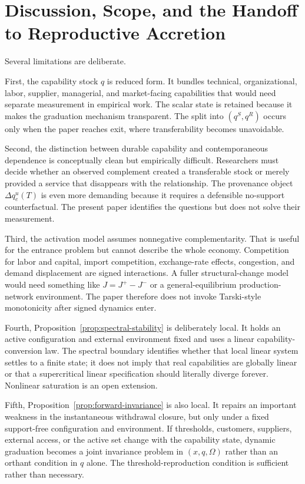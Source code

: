 \section{Discussion, Scope, and the Handoff to Reproductive Accretion}
\label{sec:discussion}

Several limitations are deliberate.

First, the capability stock $q$ is reduced form. It bundles technical, organizational, labor, supplier, managerial, and market-facing capabilities that would need separate measurement in empirical work. The scalar state is retained because it makes the graduation mechanism transparent. The split into $(q^S,q^R)$ occurs only when the paper reaches exit, where transferability becomes unavoidable.

Second, the distinction between durable capability and contemporaneous dependence is conceptually clean but empirically difficult. Researchers must decide whether an observed complement created a transferable stock or merely provided a service that disappears with the relationship. The provenance object $\Delta q_e^u(T)$ is even more demanding because it requires a defensible no-support counterfactual. The present paper identifies the questions but does not solve their measurement.

Third, the activation model assumes nonnegative complementarity. That is useful for the entrance problem but cannot describe the whole economy. Competition for labor and capital, import competition, exchange-rate effects, congestion, and demand displacement are signed interactions. A fuller structural-change model would need something like $J=J^+-J^-$ or a general-equilibrium production-network environment. The paper therefore does not invoke Tarski-style monotonicity after signed dynamics enter.

Fourth, Proposition~\ref{prop:spectral-stability} is deliberately local. It holds an active configuration and external environment fixed and uses a linear capability-conversion law. The spectral boundary identifies whether that local linear system settles to a finite state; it does not imply that real capabilities are globally linear or that a supercritical linear specification should literally diverge forever. Nonlinear saturation is an open extension.

Fifth, Proposition~\ref{prop:forward-invariance} is also local. It repairs an important weakness in the instantaneous withdrawal closure, but only under a fixed support-free configuration and environment. If thresholds, customers, suppliers, external access, or the active set change with the capability state, dynamic graduation becomes a joint invariance problem in $(x,q,\Omega)$ rather than an orthant condition in $q$ alone. The threshold-reproduction condition is sufficient rather than necessary.

